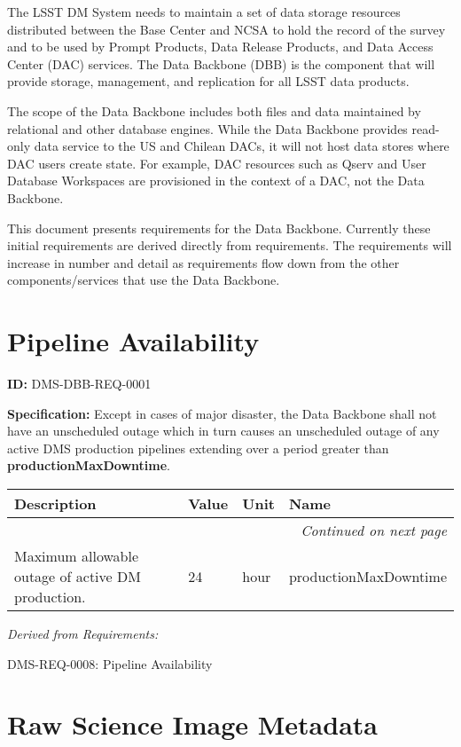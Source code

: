 \documentclass[SE,toc,lsstdraft]{lsstdoc}
\date{2019-06-11}
\makeatletter
\newcommand{\paramname}[1]{\hspace{0pt}#1}
\newcommand{\unitname}[1]{\hspace{0pt}#1}
\newenvironment{parameters}[0]{%
\setlength\LTleft{0pt}
\setlength\LTright{\fill}
\begin{small}
\begin{longtable}[]{|p{0.49\textwidth}|l|p{0.6in}|p{1.70in}@{}|}

\hline \textbf{Description} & \textbf{Value} & \textbf{Unit} & \textbf{Name} \\ \hline
\endhead

\hline \multicolumn{4}{r}{\emph{Continued on next page}} \\
\endfoot

\hline\hline
\endlastfoot
}{%
\hline
\end{longtable}
\end{small}
}
\makeatother
\begin{document}
\maketitle

The LSST DM System needs to maintain a set of data storage resources
distributed between the Base Center and NCSA to hold the record of
the survey and to be used by Prompt Products, Data Release Products,
and Data Access Center (DAC) services.  The Data Backbone (DBB) is the component that will provide storage, management, and replication for all LSST data products.

The scope of the Data Backbone includes both files and data maintained by relational and other database engines.  While the Data Backbone provides read-only data service to the US and Chilean DACs, it will not host data stores where DAC users create state.  For example,
DAC resources such as Qserv and User Database Workspaces are provisioned in the context of a DAC, not the Data Backbone.

This document presents requirements for the Data Backbone.  Currently these initial requirements are derived directly from  requirements.  The requirements will increase in number and detail
as requirements flow down from the other components/services that use the Data Backbone.

\section{Pipeline Availability}

\label{DMS-DBB-REQ-0001}
\textbf{ID:} DMS-DBB-REQ-0001

\textbf{Specification:}
Except in cases of major disaster, the Data Backbone shall not have an unscheduled outage which in turn causes an unscheduled outage of any active DMS production pipelines extending over a period greater than \textbf{productionMaxDowntime}.

\begin{parameters}
Maximum allowable outage of active DM production.
&
24
&
\unitname{%
hour
}
&
\paramname{%
productionMaxDowntime
} \\\hline
\end{parameters}

\emph{Derived from Requirements:}

DMS-REQ-0008:
Pipeline Availability \newline

\section{Raw Science Image Metadata}
\end{document}
